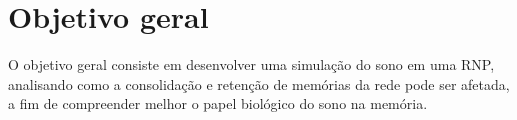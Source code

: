\section{Objetivo geral}

O objetivo geral consiste em desenvolver uma simulação do sono em uma RNP, analisando como a consolidação e
retenção de memórias da rede pode ser afetada, a fim de compreender melhor o papel biológico do sono na memória.
